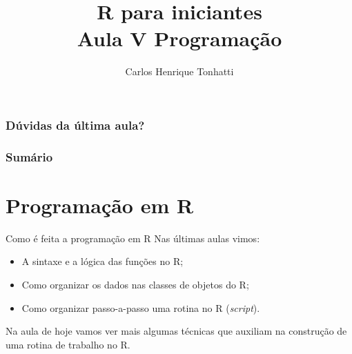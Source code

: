 \documentclass[handout]{beamer}
\title[Linguagem R]{R para iniciantes\\ Aula V Programação}
\author {Carlos Henrique Tonhatti}
\institute[Unicamp]{Universidade Estadual de Campinas}
\date{}
\begin{document}
\frame{\titlepage} %

\begin{frame}
  \frametitle{Dúvidas da última aula?}
\end{frame}

\begin{frame}
 \frametitle{Sumário}
 \tableofcontents[pausesections]
  \setcounter{tocdepth}{2}%
\end{frame}


\section{Programação em R}
\begin{frame}{Como é feita a programação em R}
  Nas últimas aulas vimos:
  \begin{itemize}[<+->]
  \item A sintaxe e a lógica das funções no R;
  \item Como organizar os dados nas classes de objetos do R;
  \item Como organizar passo-a-passo uma rotina no R (\textit{script}).
  \end{itemize}
  \pause Na aula de hoje vamos ver mais algumas técnicas que auxiliam na construção de uma rotina de trabalho no R.
\end{frame}
\end{document}

